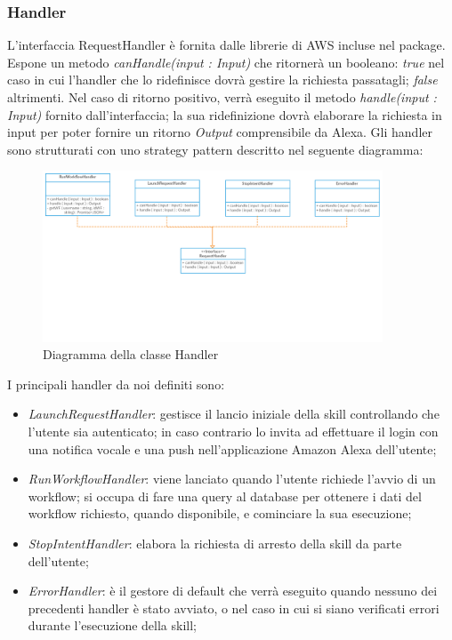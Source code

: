 \subsubsection{Handler}
L'interfaccia RequestHandler è fornita dalle librerie di AWS incluse nel package.
Espone un metodo \textit{canHandle(input : Input)} che ritornerà un booleano: \textit{true} nel caso in cui l'handler che lo ridefinisce dovrà gestire la richiesta passatagli; \textit{false} altrimenti.
Nel caso di ritorno positivo, verrà eseguito il metodo \textit{handle(input : Input)} fornito dall'interfaccia; la sua ridefinizione dovrà elaborare la richiesta in input per poter fornire un ritorno \textit{Output} comprensibile da Alexa.
Gli handler sono strutturati con uno strategy pattern descritto nel seguente diagramma:

\begin{figure}[H]
	\begin{center}
		\includegraphics[width=0.9\textwidth, keepaspectratio]{../includes/pics/Strategy Pattern.png}
		\caption{Diagramma della classe Handler}
	\end{center}
\end{figure}


I principali handler da noi definiti sono:
\begin{itemize}
	\item \textit{LaunchRequestHandler}: gestisce il lancio iniziale della skill controllando che l'utente sia autenticato; in caso contrario lo invita ad effettuare il login con una notifica vocale e una push nell'applicazione Amazon Alexa dell'utente;
	\item \textit{RunWorkflowHandler}: viene lanciato quando l'utente richiede l'avvio di un workflow; si occupa di fare una query al database per ottenere i dati del workflow richiesto, quando disponibile, e cominciare la sua esecuzione;
	\item \textit{StopIntentHandler}: elabora la richiesta di arresto della skill da parte dell'utente;
	\item \textit{ErrorHandler}: è il gestore di default che verrà eseguito quando nessuno dei precedenti handler è stato avviato, o nel caso in cui si siano verificati errori durante l'esecuzione della skill;
\end{itemize}


